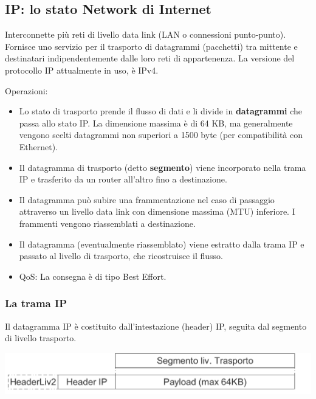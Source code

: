     \subsection{IP: lo stato Network di Internet}
        Interconnette più reti di livello data link (LAN o connessioni punto-punto). Fornisce uno servizio per il trasporto di datagrammi (pacchetti) tra mittente e destinatari indipendentemente dalle loro reti di appartenenza. La versione del protocollo IP attualmente in uso, è IPv4.
    
        Operazioni:
        \begin{itemize}
            \item Lo stato di trasporto prende il flusso di dati e li divide in \textbf{datagrammi} che passa allo stato IP. La dimensione massima è di 64 KB, ma generalmente vengono scelti datagrammi non superiori a 1500 byte (per compatibilità con Ethernet).
            \item Il datagramma di trasporto (detto \textbf{segmento}) viene incorporato nella trama IP e trasferito da un router all'altro fino a destinazione.
            \item Il datagramma può subire una frammentazione nel caso di passaggio attraverso un livello data link con dimensione massima (MTU) inferiore. I frammenti vengono riassemblati a destinazione.
            \item Il datagramma (eventualmente riassemblato) viene estratto dalla trama IP e passato al livello di trasporto, che ricostruisce il flusso.
            \item QoS: La consegna è di tipo Best Effort.
        \end{itemize}

        \subsubsection{La trama IP}
            Il datagramma IP è costituito dall'intestazione (header) IP, seguita dal segmento di livello trasporto.

            \begin{center}
                \includegraphics[scale=0.33]{chapters/4/assets/schema_c.png}
            \end{center}

